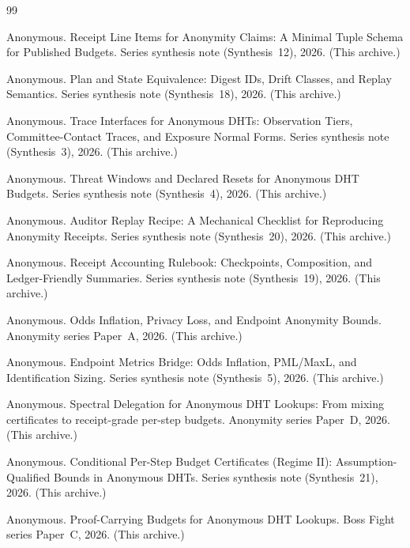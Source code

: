 \documentclass[11pt]{article}
\begin{document}
\begin{thebibliography}{99}\small

Anonymous.
\newblock Receipt Line Items for Anonymity Claims: A Minimal Tuple Schema for Published Budgets.
\newblock Series synthesis note (Synthesis~12), 2026. (This archive.)

Anonymous.
\newblock Plan and State Equivalence: Digest IDs, Drift Classes, and Replay Semantics.
\newblock Series synthesis note (Synthesis~18), 2026. (This archive.)

Anonymous.
\newblock Trace Interfaces for Anonymous DHTs: Observation Tiers, Committee-Contact Traces, and Exposure Normal Forms.
\newblock Series synthesis note (Synthesis~3), 2026. (This archive.)

Anonymous.
\newblock Threat Windows and Declared Resets for Anonymous DHT Budgets.
\newblock Series synthesis note (Synthesis~4), 2026. (This archive.)

Anonymous.
\newblock Auditor Replay Recipe: A Mechanical Checklist for Reproducing Anonymity Receipts.
\newblock Series synthesis note (Synthesis~20), 2026. (This archive.)

Anonymous.
\newblock Receipt Accounting Rulebook: Checkpoints, Composition, and Ledger-Friendly Summaries.
\newblock Series synthesis note (Synthesis~19), 2026. (This archive.)

Anonymous.
\newblock Odds Inflation, Privacy Loss, and Endpoint Anonymity Bounds.
\newblock Anonymity series Paper~A, 2026. (This archive.)

Anonymous.
\newblock Endpoint Metrics Bridge: Odds Inflation, PML/MaxL, and Identification Sizing.
\newblock Series synthesis note (Synthesis~5), 2026. (This archive.)

Anonymous.
\newblock Spectral Delegation for Anonymous DHT Lookups: From mixing certificates to receipt-grade per-step budgets.
\newblock Anonymity series Paper~D, 2026. (This archive.)

Anonymous.
\newblock Conditional Per-Step Budget Certificates (Regime II): Assumption-Qualified Bounds in Anonymous DHTs.
\newblock Series synthesis note (Synthesis~21), 2026. (This archive.)

Anonymous.
\newblock Proof-Carrying Budgets for Anonymous DHT Lookups.
\newblock Boss Fight series Paper~C, 2026. (This archive.)


\end{thebibliography}
\end{document}
